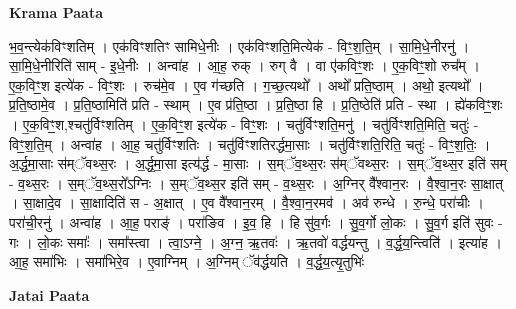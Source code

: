 \documentclass[17pt]{extarticle}
\begin{document}
\textbf{Krama Paata} \newline

भ॒व॒न्त्येक॑विꣳशतिम् । एक॑विꣳशतिꣳ सामिधे॒नीः । एक॑विꣳशति॒मित्येक॑ - विꣳ॒॒श॒ति॒म् । सा॒मि॒धे॒नीरनु॑ । सा॒मि॒धे॒नीरिति॑ साम् - इ॒धे॒नीः । अन्वा॑ह । आ॒ह॒ रुक् । रुग् वै । वा ए॑कविꣳ॒॒शः । ए॒क॒विꣳ॒॒शो रुच᳚म् । ए॒क॒विꣳ॒॒श इत्ये॑क - विꣳ॒॒शः । रुच॑मे॒व । ए॒व ग॑च्छति । ग॒च्छ॒त्यथो᳚ । अथो᳚ प्रति॒ष्ठाम् । अथो॒ इत्यथो᳚ । प्र॒ति॒ष्ठामे॒व । प्र॒ति॒ष्ठामिति॑ प्रति - स्थाम् । ए॒व प्र॑ति॒ष्ठा । प्र॒ति॒ष्ठा हि । प्र॒ति॒ष्ठेति॑ प्रति - स्था । ह्ये॑कविꣳ॒॒शः । ए॒क॒विꣳ॒॒श,श्चतु॑र्विꣳशतिम् । ए॒क॒विꣳ॒॒श इत्ये॑क - विꣳ॒॒शः । चतु॑र्विꣳशति॒मनु॑ । चतु॑र्विꣳशति॒मिति॒ चतुः॑ - विꣳ॒॒श॒ति॒म् । अन्वा॑ह । आ॒ह॒ चतु॑र्विꣳशतिः । चतु॑र्विꣳशतिरर्द्धमा॒साः । चतु॑र्विꣳशति॒रिति॒ चतुः॑ - विꣳ॒॒श॒तिः॒ । अ॒र्द्ध॒मा॒साः स॑म्ॅवथ्स॒रः । अ॒र्द्ध॒मा॒सा इत्य॑र्द्ध - मा॒साः । स॒म्ॅव॒थ्स॒रः स॑म्ॅवथ्स॒रः । स॒म्ॅव॒थ्स॒र इति॑ सम् - व॒थ्स॒रः । स॒म्ॅव॒थ्स॒रो᳚ऽग्निः । स॒म्ॅव॒थ्स॒र इति॑ सम् - व॒थ्स॒रः । अ॒ग्निर् वै᳚श्वान॒रः । वै॒श्वा॒न॒रः सा॒क्षात् । सा॒क्षादे॒व । सा॒क्षादिति॑ स - अ॒क्षात् । ए॒व वै᳚श्वान॒रम् । वै॒श्वा॒न॒रमव॑ । अव॑ रुन्धे । रु॒न्धे॒ परा॑चीः । परा॑ची॒रनु॑ । अन्वा॑ह । आ॒ह॒ पराङ्॑ । परा॑ङिव । इ॒व॒ हि । हि सु॑व॒र्गः । सु॒व॒र्गो लो॒कः । सु॒व॒र्ग इति॑ सुवः - गः । लो॒कः समाः᳚ । समा᳚स्त्वा । त्वा॒ऽग्ने॒ । अ॒ग्न॒ ऋ॒तवः॑ । ऋ॒तवो॑ वर्द्धयन्तु । व॒र्द्ध॒य॒न्त्विति॑ । इत्या॑ह । आ॒ह॒ समा॑भिः । समा॑भिरे॒व । ए॒वाग्निम् । अ॒ग्निम् ॅव॑र्द्धयति । व॒र्द्ध॒य॒त्यृ॒तुभिः॑ \newline

\textbf{Jatai Paata} \newline
\end{document}

